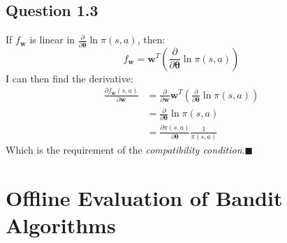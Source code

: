 \documentclass[a4paper]{article}
\newcommand*{\QEDA}{\hfill\ensuremath{\blacksquare}}%
\newcommand*{\bs}[1]{\boldsymbol{#1}}
\begin{document}
\subsection*{Question 1.3}
\label{subsec:13}
If $f_{\boldsymbol{w}}$ is linear in $\frac{\partial}{\partial
  \boldsymbol{\theta}} \ln \pi(s, a)$, then: 
\[
f_{\boldsymbol{w}} = \bs{w}^T \left(\frac{\partial}{\partial \boldsymbol{\theta}} \ln \pi(s, a)\right)
\]
I can then find the derivative:
\begin{align*}
  \frac{\partial f_{\bs{w}} (s,a)}{\partial \boldsymbol{w}} &=
  \frac{\partial}{\partial \boldsymbol{w}} \bs{w}^T
  \left(\frac{\partial}{\partial \boldsymbol{\theta}} \ln \pi(s, a)\right)\\
  &=
  \frac{\partial}{\partial \boldsymbol{\theta}} \ln \pi(s, a)\\
  &= \frac{\partial \pi(s,a)}{\partial
    \bs{\theta}}\frac{1}{\pi(s, a)} \tag{using chain rule}
\end{align*}
Which is the requirement of the \emph{compatibility condition}.\QEDA

\section{Offline Evaluation of Bandit Algorithms}
\label{sec:2}
\end{document}
